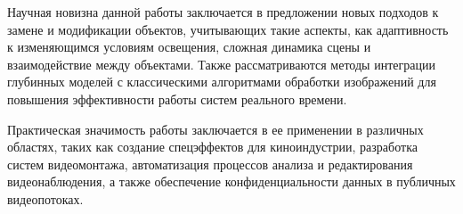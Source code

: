Научная новизна данной работы заключается в предложении новых подходов к замене и модификации объектов, учитывающих такие аспекты, как адаптивность к изменяющимся условиям освещения, сложная динамика сцены и взаимодействие между объектами. Также рассматриваются методы интеграции глубинных моделей с классическими алгоритмами обработки изображений для повышения эффективности работы систем реального времени.

Практическая значимость работы заключается в ее применении в различных областях, таких как создание спецэффектов для киноиндустрии, разработка систем видеомонтажа, автоматизация процессов анализа и редактирования видеонаблюдения, а также обеспечение конфиденциальности данных в публичных видеопотоках.